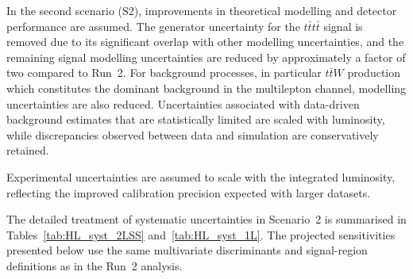 In the second scenario (S2), improvements in theoretical modelling and detector performance are assumed. 
The generator uncertainty for the $t\bar{t}t\bar{t}$ signal is removed due to its significant overlap with other modelling uncertainties, and the remaining signal modelling uncertainties are reduced by approximately a factor of two compared to Run~2. 
For background processes, in particular $t\bar{t}W$ production which constitutes the dominant background in the multilepton channel, modelling uncertainties are also reduced. 
Uncertainties associated with data-driven background estimates that are statistically limited are scaled with luminosity, while discrepancies observed between data and simulation are conservatively retained.

Experimental uncertainties are assumed to scale with the integrated luminosity, reflecting the improved calibration precision expected with larger datasets.

The detailed treatment of systematic uncertainties in Scenario~2 is summarised in Tables~\ref{tab:HL_syst_2LSS} and~\ref{tab:HL_syst_1L}. 
The projected sensitivities presented below use the same multivariate discriminants and signal-region definitions as in the Run~2 analysis.

